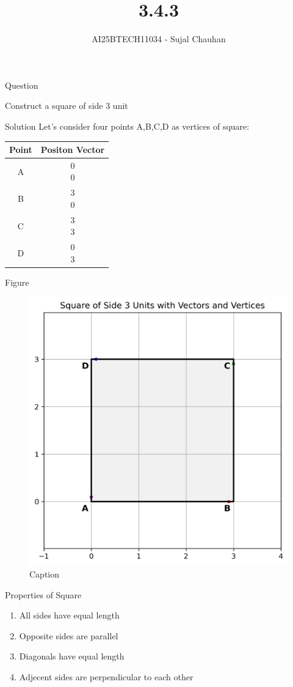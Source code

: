 \documentclass{beamer}
\title
{3.4.3}
\author 
{AI25BTECH11034 - Sujal Chauhan }
\begin{document}
\frame{\titlepage}
\begin{frame}{Question}

Construct a square of side 3 unit
\end{frame}


\begin{frame}{Solution}
Let's consider four points A,B,C,D as vertices of square:
\begin{center}
    \begin{tabular}{|c|c|} \hline
       Point  & Positon Vector \\ \hline
       A  & \myvec{0 \\ 0} \\ \hline
       B  & \myvec{3 \\ 0} \\ \hline
       C  & \myvec{3\\ 3} \\ \hline
       D  & \myvec{0 \\ 3} \\ \hline
    \end{tabular}
\end{center}
\end{frame}
\begin{frame}{Figure}
\begin{figure}[h]
    \centering
    \includegraphics[width=0.5\linewidth]{figures/square_plot.png}
    \caption{Caption}
    \label{square}
\end{figure}

\end{frame}
\begin{frame}{Properties of Square}

\begin{enumerate}
    \item All sides have equal length
    \item Opposite sides are parallel
    \item Diagonals have equal length
    \item Adjecent sides are perpendicular to each other
\end{enumerate}
\end{frame}
\end{document}
